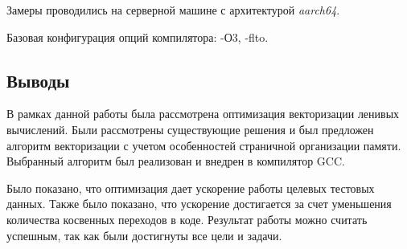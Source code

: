 Замеры проводились на серверной машине с архитектурой \textit{aarch64}.

Базовая конфигурация опций компилятора: -О3, -flto.

\subsection{Выводы}

В рамках данной работы была рассмотрена оптимизация векторизации ленивых вычислений. Были рассмотрены существующие решения и был предложен алгоритм векторизации с учетом особенностей страничной организации памяти. Выбранный алгоритм был реализован и внедрен в компилятор GCC.

Было показано, что оптимизация дает ускорение работы целевых тестовых данных. Также было показано, что ускорение достигается за счет уменьшения количества косвенных переходов в коде. Результат работы можно считать успешным, так как были достигнуты все цели и задачи.

\newpage

